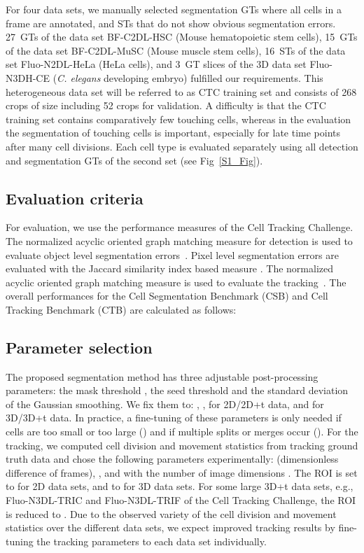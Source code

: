 \documentclass[10pt,letterpaper]{article}
\begin{document}
For four data sets, we manually selected segmentation GTs where all cells in a frame are annotated, and STs that do not show obvious segmentation errors. 27~GTs of the data set BF-C2DL-HSC (Mouse hematopoietic stem cells), 15~GTs of the data set BF-C2DL-MuSC (Mouse muscle stem cells), 16~STs of the data set Fluo-N2DL-HeLa (HeLa cells), and 3~GT slices of the 3D data set Fluo-N3DH-CE (\textit{C. elegans} developing embryo) fulfilled our requirements. This heterogeneous data set will be referred to as CTC training set and consists of 268 crops of size  including 52 crops for validation. A difficulty is that the CTC training set contains comparatively few touching cells, whereas in the evaluation the segmentation of touching cells is important, especially for late time points after many cell divisions. Each cell type is evaluated separately using all detection and segmentation GTs of the second set (see Fig~\ref{S1_Fig}).

\subsection*{Evaluation criteria}
For evaluation, we use the performance measures of the Cell Tracking Challenge. The normalized acyclic oriented graph matching measure for detection  is used to evaluate object level segmentation errors~\cite{Matula2015}. Pixel level segmentation errors are evaluated with the Jaccard similarity index based measure . The normalized acyclic oriented graph matching measure  is used to evaluate the tracking~\cite{Matula2015}. The overall performances for the Cell Segmentation Benchmark (CSB) and Cell Tracking Benchmark (CTB) are calculated as follows:


\subsection*{Parameter selection}
The proposed segmentation method has three adjustable post-processing parameters: the mask threshold , the seed threshold  and the standard deviation  of the Gaussian smoothing. We fix them to: , ,  for 2D/2D+t data, and  for 3D/3D+t data. In practice, a fine-tuning of these parameters is only needed if cells are too small or too large () and if multiple splits or merges occur (). For the tracking, we computed cell division and movement statistics from tracking ground truth data and chose the following parameters experimentally:  (dimensionless difference of frames), ,  and  with the number of image dimensions . The ROI is set to  for 2D data sets, and to  for 3D data sets. For some large 3D+t data sets, e.g., Fluo-N3DL-TRIC and Fluo-N3DL-TRIF of the Cell Tracking Challenge, the ROI is reduced to . Due to the observed variety of the cell division and movement statistics over the different data sets, we expect improved tracking results by fine-tuning the tracking parameters to each data set individually.
\end{document}
